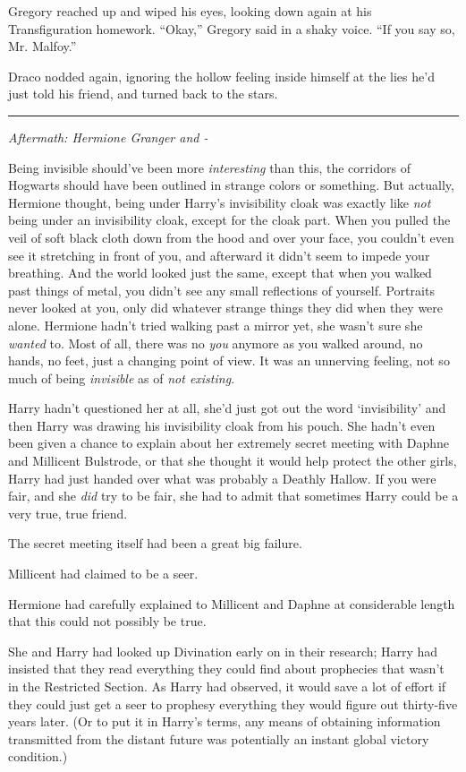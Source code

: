 Gregory reached up and wiped his eyes, looking down again at his Transfiguration homework. ``Okay,'' Gregory said in a shaky voice. ``If you say so, Mr. Malfoy.''

Draco nodded again, ignoring the hollow feeling inside himself at the lies he'd just told his friend, and turned back to the stars.

\begin{center}\rule{3in}{0.4pt}\end{center}

\emph{Aftermath: Hermione Granger and -}

Being invisible should've been more \emph{interesting} than this, the corridors of Hogwarts should have been outlined in strange colors or something. But actually, Hermione thought, being under Harry's invisibility cloak was exactly like \emph{not} being under an invisibility cloak, except for the cloak part. When you pulled the veil of soft black cloth down from the hood and over your face, you couldn't even see it stretching in front of you, and afterward it didn't seem to impede your breathing. And the world looked just the same, except that when you walked past things of metal, you didn't see any small reflections of yourself. Portraits never looked at you, only did whatever strange things they did when they were alone. Hermione hadn't tried walking past a mirror yet, she wasn't sure she \emph{wanted} to. Most of all, there was no \emph{you} anymore as you walked around, no hands, no feet, just a changing point of view. It was an unnerving feeling, not so much of being \emph{invisible} as of \emph{not existing.}

Harry hadn't questioned her at all, she'd just got out the word `invisibility' and then Harry was drawing his invisibility cloak from his pouch. She hadn't even been given a chance to explain about her extremely secret meeting with Daphne and Millicent Bulstrode, or that she thought it would help protect the other girls, Harry had just handed over what was probably a Deathly Hallow. If you were fair, and she \emph{did} try to be fair, she had to admit that sometimes Harry could be a very true, true friend.

The secret meeting itself had been a great big failure.

Millicent had claimed to be a seer.

Hermione had carefully explained to Millicent and Daphne at considerable length that this could not possibly be true.

She and Harry had looked up Divination early on in their research; Harry had insisted that they read everything they could find about prophecies that wasn't in the Restricted Section. As Harry had observed, it would save a lot of effort if they could just get a seer to prophesy everything they would figure out thirty-five years later. (Or to put it in Harry's terms, any means of obtaining information transmitted from the distant future was potentially an instant global victory condition.)

